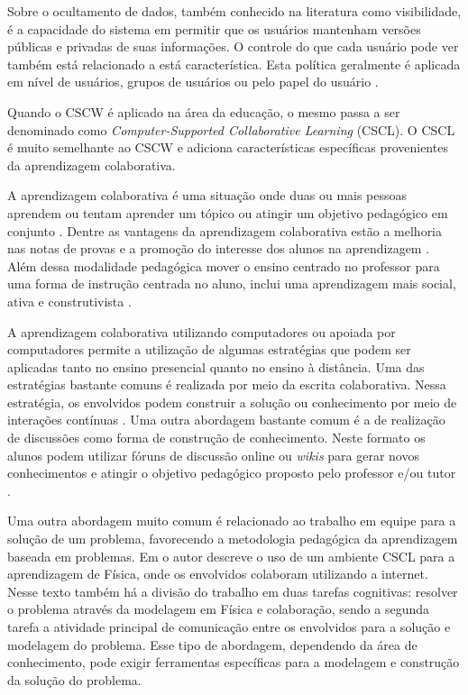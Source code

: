 Sobre o ocultamento de dados, também conhecido na literatura como visibilidade, é a capacidade do sistema em permitir que os usuários mantenham versões públicas e privadas de suas informações. O controle do que cada usuário pode ver também está relacionado a está característica. Esta política geralmente é aplicada em nível de usuários, grupos de usuários ou pelo papel do usuário \cite{ramanau_researching_2009, reinhard_cscw_1994}.

Quando o CSCW é aplicado na área da educação, o mesmo passa a ser denominado como \emph{Computer-Supported Collaborative Learning} (CSCL). O CSCL é muito semelhante ao CSCW e adiciona características específicas provenientes da aprendizagem colaborativa.


A aprendizagem colaborativa é uma situação onde duas ou mais pessoas aprendem ou tentam aprender um tópico ou atingir um objetivo pedagógico em conjunto \cite{chuang_sscls_2015}. Dentre as vantagens da aprendizagem colaborativa estão a melhoria nas notas de provas e a promoção do interesse dos alunos na aprendizagem \cite{caldwell_2007, pollock_2006}. Além dessa modalidade pedagógica mover o ensino centrado no professor para uma forma de instrução centrada no aluno, inclui uma aprendizagem mais social, ativa e construtivista \cite{kirschner_2001}.

A aprendizagem colaborativa utilizando computadores ou apoiada por computadores permite a utilização de algumas estratégias que podem ser aplicadas tanto no ensino presencial quanto no ensino à distância. Uma das estratégias bastante comuns é realizada por meio da escrita colaborativa. Nessa estratégia, os envolvidos podem construir a solução ou conhecimento por meio de interações contínuas \cite{onrubia_2009}. Uma outra abordagem bastante comum é a de realização de discussões como forma de construção de conhecimento. Neste formato os alunos podem utilizar fóruns de discussão online ou \emph{wikis} para gerar novos conhecimentos e atingir o objetivo pedagógico proposto pelo professor e/ou tutor \cite{ramanau_researching_2009}.

Uma outra abordagem muito comum é relacionado ao trabalho em equipe para a solução de um problema, favorecendo a metodologia pedagógica da aprendizagem baseada em problemas. Em  o autor descreve o uso de um ambiente CSCL para a aprendizagem de Física, onde os envolvidos colaboram utilizando a internet. Nesse texto também há a divisão do trabalho em duas tarefas cognitivas: resolver o problema através da modelagem em Física e colaboração, sendo a segunda tarefa a atividade principal de comunicação entre os envolvidos para a solução e modelagem do problema. Esse tipo de abordagem, dependendo da área de conhecimento, pode exigir ferramentas específicas para a modelagem e construção da solução do problema.


